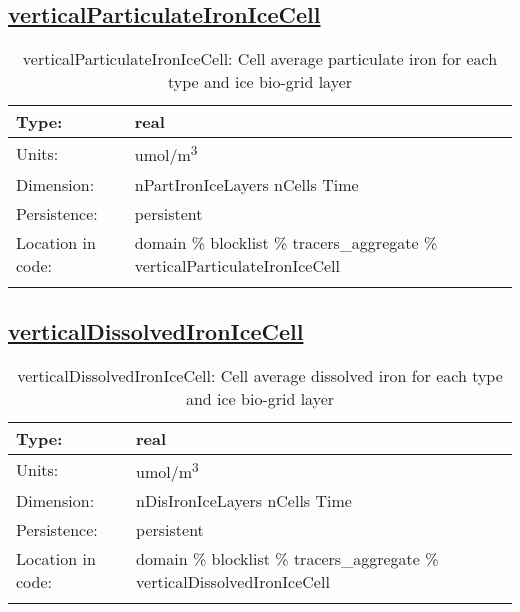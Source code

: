 \subsection[verticalParticulateIronIceCell]{\hyperref[sec:var_tab_tracers_aggregate]{verticalParticulateIronIceCell}}
\label{subsec:var_sec_tracers_aggregate_verticalParticulateIronIceCell}
\begin{center}
\begin{longtable}{| p{2.0in} | p{4.0in} |}
        \hline 
        Type: & real \\
        \hline 
        Units: & \si{umol/m^3} \\
        \hline 
        Dimension: & nPartIronIceLayers nCells Time \\
        \hline 
        Persistence: & persistent \\
        \hline 
         Location in code: & domain \% blocklist \% tracers\_aggregate \% verticalParticulateIronIceCell \\
         \hline 
    \caption{verticalParticulateIronIceCell: Cell average particulate iron for each type and ice bio-grid layer}
\end{longtable}
\end{center}
\subsection[verticalDissolvedIronIceCell]{\hyperref[sec:var_tab_tracers_aggregate]{verticalDissolvedIronIceCell}}
\label{subsec:var_sec_tracers_aggregate_verticalDissolvedIronIceCell}
\begin{center}
\begin{longtable}{| p{2.0in} | p{4.0in} |}
        \hline 
        Type: & real \\
        \hline 
        Units: & \si{umol/m^3} \\
        \hline 
        Dimension: & nDisIronIceLayers nCells Time \\
        \hline 
        Persistence: & persistent \\
        \hline 
         Location in code: & domain \% blocklist \% tracers\_aggregate \% verticalDissolvedIronIceCell \\
         \hline 
    \caption{verticalDissolvedIronIceCell: Cell average dissolved iron for each type and ice bio-grid layer}
\end{longtable}
\end{center}
